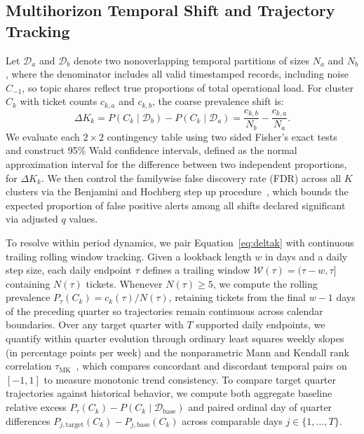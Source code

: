 \documentclass[sigconf,anonymous,pbalance]{acmart}
\begin{document}
\subsection{Multihorizon Temporal Shift and Trajectory Tracking}
Let $\mathcal{D}_a$ and $\mathcal{D}_b$ denote two nonoverlapping temporal partitions of sizes $N_a$ and $N_b$, where the denominator includes all valid timestamped records, including noise $C_{-1}$, so topic shares reflect true proportions of total operational load. For cluster $C_k$ with ticket counts $c_{k, a}$ and $c_{k, b}$, the coarse prevalence shift is:
\begin{equation}
\label{eq:deltak}
\Delta K_k = P(C_k \mid \mathcal{D}_b) - P(C_k \mid \mathcal{D}_a) = \frac{c_{k, b}}{N_b} - \frac{c_{k, a}}{N_a}.
\end{equation}
We evaluate each $2 \times 2$ contingency table using two sided Fisher's exact tests~\cite{fisher1922interpretation} and construct 95\% Wald confidence intervals, defined as the normal approximation interval for the difference between two independent proportions, for $\Delta K_k$. We then control the familywise false discovery rate (FDR) across all $K$ clusters via the Benjamini and Hochberg step up procedure~\cite{benjamini1995controlling}, which bounds the expected proportion of false positive alerts among all shifts declared significant via adjusted $q$ values.

To resolve within period dynamics, we pair Equation~\ref{eq:deltak} with continuous trailing rolling window tracking. Given a lookback length $w$ in days and a daily step size, each daily endpoint $\tau$ defines a trailing window $\mathcal{W}(\tau) = (\tau - w, \tau]$ containing $N(\tau)$ tickets. Whenever $N(\tau) \ge 5$, we compute the rolling prevalence $P_\tau(C_k) = c_{k}(\tau) / N(\tau)$, retaining tickets from the final $w-1$ days of the preceding quarter so trajectories remain continuous across calendar boundaries. Over any target quarter with $T$ supported daily endpoints, we quantify within quarter evolution through ordinary least squares weekly slopes (in percentage points per week) and the nonparametric Mann and Kendall rank correlation $\tau_{\text{MK}}$~\cite{mann1945nonparametric, kendall1948rank}, which compares concordant and discordant temporal pairs on $[-1, 1]$ to measure monotonic trend consistency. To compare target quarter trajectories against historical behavior, we compute both aggregate baseline relative excess $P_\tau(C_k) - P(C_k \mid \mathcal{D}_{\text{base}})$ and paired ordinal day of quarter differences $P_{j, \text{target}}(C_k) - P_{j, \text{base}}(C_k)$ across comparable days $j \in \{1, \dots, T\}$.
\end{document}
